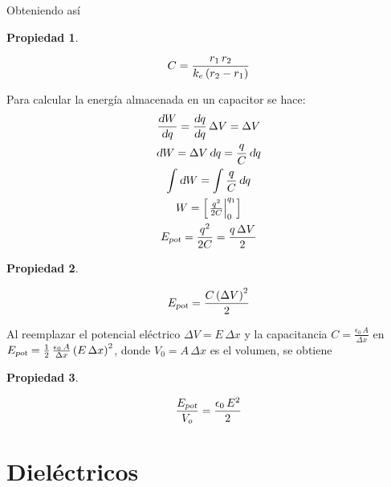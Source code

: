 \documentclass[a5paper,12pt,twoside]{book}
\newtheorem{prop}{{Propiedad}}[chapter]
\begin{document}
Obteniendo así

\begin{mdframed}[style=MyFrame1]
    \begin{prop}
    \end{prop}
    \begin{equation*}
        C = \frac{r_1 \, r_2}{k_e \left(r_2 - r_1\right)}
    \end{equation*}
\end{mdframed}

Para calcular la energía almacenada en un capacitor se hace:
\begin{gather*}
    \frac{\textsl{d} W}{\textsl{d} q} = \frac{\textsl{d} q}{\textsl{d} q} \, \Delta V = \Delta V
    \\
    \textsl{d} W = \Delta V \, \textsl{d} q = \frac{q}{C} \, \textsl{d} q
    \\
    \int \textsl{d} W = \int \frac{q}{C} \, \textsl{d} q
    \\
    W = \begin{bmatrix} \left. \frac{q^2}{2C} \right|_{0}^{q_1} \end{bmatrix}
    \\
    {{E}_\textsl{{pot}}} = \frac{q^2}{2C} = \frac{q \, \Delta V}{2}
\end{gather*}

\begin{mdframed}[style=MyFrame1]
    \begin{prop}
    \end{prop}
    \begin{equation*}
        {{E}_\textsl{{pot}}} = \frac{C \left(\Delta V\right)^2}{2}
    \end{equation*}
\end{mdframed}

Al reemplazar el potencial eléctrico $\Delta V = E \, \Delta x$ y la capacitancia $C = \tfrac{\epsilon_0 \, A}{\Delta x}$ en ${{E}_\textsl{{pot}}} = \tfrac{1}{2} \, \tfrac{\epsilon_0 \, A}{\Delta x} \left(E \, \Delta x\right)^2$, donde $V_0 = A \, \Delta x$ es el volumen, se obtiene

\begin{mdframed}[style=MyFrame1]
    \begin{prop}
    \end{prop}
    \begin{equation*}
        \dfrac{{{E}_\textsl{{pot}}}}{V_o} = \frac{\epsilon_0 \, E^2}{2}
    \end{equation*}
\end{mdframed}


\section{Dieléctricos}
\end{document}
